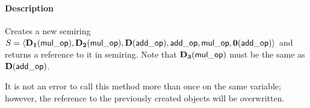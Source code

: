 \paragraph{Description}

Creates a new semiring $S = \langle \bold{D_1}({\sf mul\_op}), 
\bold{D_2}({\sf mul\_op}), \bold{D}({\sf add\_op}), {\sf add\_op}, 
{\sf mul\_op}, \bold{0}({\sf add\_op})\rangle$ and returns a reference to it in 
{\sf semiring}.  Note that $\bold{D_3}({\sf mul\_op})$ must be the same as 
$\bold{D}({\sf add\_op})$.

It is not an error to call this method more than once on the same variable;  
however, the reference to the previously created objects will be overwritten. 